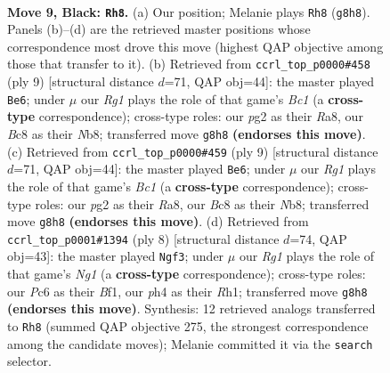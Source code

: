 \documentclass[11pt]{article}
\begin{document}
\clearpage

\begin{figure}[p]\centering
\begin{subfigure}{0.46\textwidth}\centering
\resizebox{\linewidth}{!}{%
\newchessgame
\chessboard[
  setfen={r1bqkbr1/p2n1ppp/2p1p3/2ppP3/3P3P/2P5/PP1N1PP1/R1BQK1NR b KQq - 0 9},
  showmover=false,
  pgfstyle=straightmove, color=movearrow, markmove={g8-h8}
]}
\caption{}
\end{subfigure}\hfill
\begin{subfigure}{0.46\textwidth}\centering
\resizebox{\linewidth}{!}{%
\newchessgame
\chessboard[
  setfen={rnbqkb1r/pp3ppp/2p2p2/3p4/2PP4/4P3/PP3PPP/RN1QKBNR b KQkq - 0 5},
  showmover=false,
  pgfstyle=straightmove, color=movearrow, markmove={c8-e6}
]}
\caption{}
\end{subfigure}
\\[4pt]
\begin{subfigure}{0.46\textwidth}\centering
\resizebox{\linewidth}{!}{%
\newchessgame
\chessboard[
  setfen={rnbqkb1r/pp3ppp/2p2p2/3p4/2PP4/4P3/PP3PPP/RN1QKBNR b KQkq - 0 5},
  showmover=false,
  pgfstyle=straightmove, color=movearrow, markmove={c8-e6}
]}
\caption{}
\end{subfigure}\hfill
\begin{subfigure}{0.46\textwidth}\centering
\resizebox{\linewidth}{!}{%
\newchessgame
\chessboard[
  setfen={rnbqkbnr/pp3p1p/4p1p1/2pp4/4P3/3P2P1/PPPN1P1P/R1BQKBNR w KQkq - 0 5},
  showmover=false,
  pgfstyle=straightmove, color=movearrow, markmove={g1-f3}
]}
\caption{}
\end{subfigure}
\caption{\textbf{Move 9, Black: \texttt{Rh8}.} (a) Our position; Melanie plays \texttt{Rh8} (\texttt{g8h8}). Panels (b)--(d) are the retrieved master positions whose correspondence most drove this move (highest QAP objective among those that transfer to it). (b) Retrieved from \texttt{ccrl\_top\_p0000\#458} (ply 9) [structural distance $d$=71, QAP obj=44]: the master played \texttt{Be6}; under $\mu$ our \emph{Rg1} plays the role of that game's \emph{Bc1} (a \textbf{cross-type} correspondence); cross-type roles: our \emph{p}g2 as their \emph{R}a8, our \emph{B}c8 as their \emph{N}b8; transferred move \texttt{g8h8} \textbf{(endorses this move)}. (c) Retrieved from \texttt{ccrl\_top\_p0000\#459} (ply 9) [structural distance $d$=71, QAP obj=44]: the master played \texttt{Be6}; under $\mu$ our \emph{Rg1} plays the role of that game's \emph{Bc1} (a \textbf{cross-type} correspondence); cross-type roles: our \emph{p}g2 as their \emph{R}a8, our \emph{B}c8 as their \emph{N}b8; transferred move \texttt{g8h8} \textbf{(endorses this move)}. (d) Retrieved from \texttt{ccrl\_top\_p0001\#1394} (ply 8) [structural distance $d$=74, QAP obj=43]: the master played \texttt{Ngf3}; under $\mu$ our \emph{Rg1} plays the role of that game's \emph{Ng1} (a \textbf{cross-type} correspondence); cross-type roles: our \emph{P}c6 as their \emph{B}f1, our \emph{p}h4 as their \emph{R}h1; transferred move \texttt{g8h8} \textbf{(endorses this move)}. Synthesis: 12 retrieved analogs transferred to \texttt{Rh8} (summed QAP objective 275, the strongest correspondence among the candidate moves); Melanie committed it via the \texttt{search} selector.}
\label{fig:thought-m17}
\end{figure}
\end{document}
